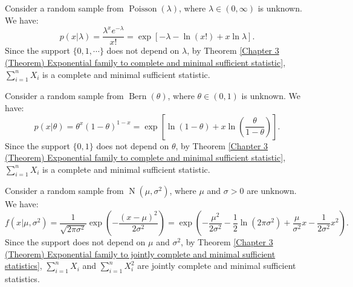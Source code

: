 \documentclass{huhtakm-template-book-v2}
\DeclareMathOperator{\Bern}{Bern}
\DeclareMathOperator{\Poisson}{Poisson}
\DeclareMathOperator{\N}{N}
\begin{document}
    \begin{eg}
        \label{Chapter 3 (Example) Complete and minimal sufficient statistic of Poisson distribution}
        Consider a random sample from $\Poisson(\lambda)$, where $\lambda\in(0,\infty)$ is unknown. We have:
        \begin{equation*}
            p(x|\lambda)=\frac{\lambda^{x}e^{-\lambda}}{x!}=\exp[-\lambda-\ln(x!)+x\ln{\lambda}].
        \end{equation*}
        Since the support $\{0,1,\cdots\}$ does not depend on $\lambda$, by Theorem \ref{Chapter 3 (Theorem) Exponential family to complete and minimal sufficient statistic}, $\sum_{i=1}^{n}X_{i}$ is a complete and minimal sufficient statistic.
    \end{eg}
    \begin{eg}
        Consider a random sample from $\Bern(\theta)$, where $\theta\in(0,1)$ is unknown. We have:
        \begin{equation*}
            p(x|\theta)=\theta^{x}(1-\theta)^{1-x}=\exp\left[\ln(1-\theta)+x\ln\left(\frac{\theta}{1-\theta}\right)\right].
        \end{equation*}
        Since the support $\{0,1\}$ does not depend on $\theta$, by Theorem \ref{Chapter 3 (Theorem) Exponential family to complete and minimal sufficient statistic}, $\sum_{i=1}^{n}X_{i}$ is a complete and minimal sufficient statistic.
    \end{eg}
    \begin{eg}
        Consider a random sample from $\N(\mu,\sigma^{2})$, where $\mu$ and $\sigma>0$ are unknown. We have:
        \begin{equation*}
            f(x|\mu,\sigma^{2})=\frac{1}{\sqrt{2\pi\sigma^{2}}}\exp\left(-\frac{(x-\mu)^{2}}{2\sigma^{2}}\right)=\exp\left(-\frac{\mu^{2}}{2\sigma^{2}}-\frac{1}{2}\ln(2\pi\sigma^{2})+\frac{\mu}{\sigma^{2}}x-\frac{1}{2\sigma^{2}}x^{2}\right).
        \end{equation*}
        Since the support does not depend on $\mu$ and $\sigma^{2}$, by Theorem \ref{Chapter 3 (Theorem) Exponential family to jointly complete and minimal sufficient statistics}, $\sum_{i=1}^{n}X_{i}$ and $\sum_{i=1}^{n}X_{i}^{2}$ are jointly complete and minimal sufficient statistics.
    \end{eg}
    \newpage
    
\end{document}
